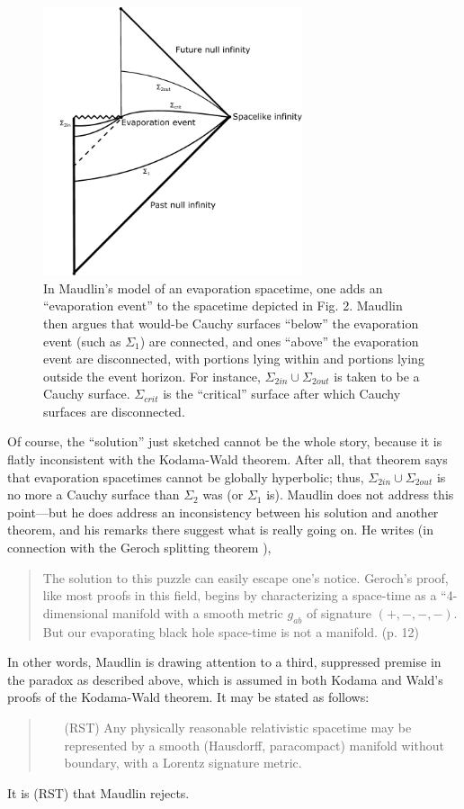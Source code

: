 \documentclass[authoryear,12pt,3p]{jowarticle}
\begin{document}
\begin{figure}[h]    \centering
   \includegraphics[width=3in]{BHE_Penrose_Diagram_--_Maudlin.pdf}
   \caption{\label{MaudlinFig} In Maudlin’s model of an evaporation spacetime, one adds an “evaporation event” to the spacetime depicted in Fig. 2. Maudlin then argues that would-be Cauchy surfaces “below” the evaporation event (such as $\Sigma_1$) are connected, and ones “above” the evaporation event are disconnected, with portions lying within and portions lying outside the event horizon. For instance, $\Sigma_{2in}\cup\Sigma_{2out}$ is taken to be a Cauchy surface. $\Sigma_{\mathit{crit}}$ is the “critical” surface after which Cauchy surfaces are disconnected.}
\end{figure}

Of course, the ``solution'' just sketched cannot be the whole story, because it is flatly inconsistent with the Kodama-Wald theorem.  After all, that theorem says that evaporation spacetimes cannot be globally hyperbolic; thus, $\Sigma_{2in}\cup\Sigma_{2out}$ is no more a Cauchy surface than $\Sigma_2$ was (or $\Sigma_1$ is).  Maudlin does not address this point---but he does address an inconsistency between his solution and another theorem, and his remarks there suggest what is really going on.  He writes (in connection with the Geroch splitting theorem \citep{GerochSplitting}),
\begin{quote}
The	solution to	this puzzle	can	easily escape one's notice.	Geroch's proof,	like most proofs in	this field,	begins by characterizing a	space-time as a “4-dimensional manifold	with a	smooth metric $g_{ab}$ of signature	$(+,-,-,-)$.  But our evaporating black	hole space-time	is not a manifold. (p. 12)
\end{quote}
In other words, Maudlin is drawing attention to a third, suppressed premise in the paradox as described above, which is assumed in both Kodama and Wald's proofs of the Kodama-Wald theorem.  It may be stated as follows:
\begin{quote}
\begin{itemize}
\item[(RST)] Any physically reasonable relativistic spacetime may be represented by a smooth (Hausdorff, paracompact) manifold without boundary, with a Lorentz signature metric.
\end{itemize}
\end{quote}
It is (RST) that Maudlin rejects.
\end{document}
